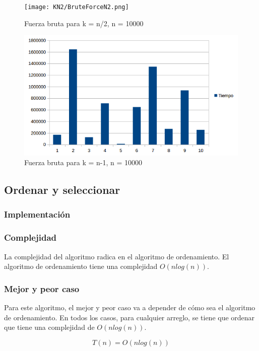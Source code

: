 \begin{figure}[H]
\centering
\texttt{[image: KN2/BruteForceN2.png]}
\caption{Fuerza bruta para k = n/2, n = 10000}
\end{figure}

\begin{figure}[H]
\centering
\includegraphics[width=\textwidth]{KN/BruteForceN.png}
\caption{Fuerza bruta para k = n-1, n = 10000}
\end{figure}

\newpage
\subsection{Ordenar y seleccionar}
\subsubsection{Implementación}

\subsubsection{Complejidad}
La complejidad del algoritmo radica en el algoritmo de ordenamiento. El algoritmo de ordenamiento tiene una complejidad $O(n log(n))$\cite{STD_SORT}.

\subsubsection{Mejor y peor caso}
Para este algoritmo, el mejor y peor caso va a depender de cómo sea el algoritmo de ordenamiento. En todos los casos, para cualquier arreglo, se tiene que ordenar que tiene una complejidad de $O(nlog(n))$.

$$ T(n) = O(nlog(n))$$

